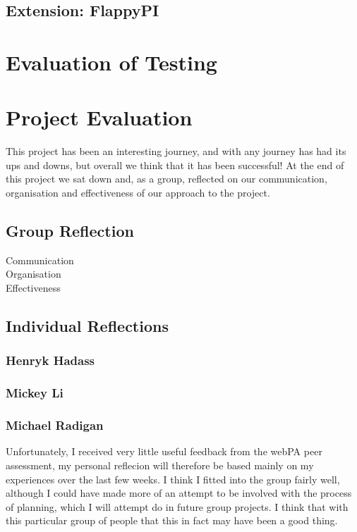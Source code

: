 \documentclass[11pt]{article}
\begin{document}
\subsection{Extension: FlappyPI}


\section{Evaluation of Testing}




\section{Project Evaluation}
This project has been an interesting journey, and with any journey has had its ups and downs, but overall we think that it has been successful! At the end of this project we sat down and, as a group, reflected on our communication, organisation and effectiveness of our approach to the project.
\subsection{Group Reflection}

\begin{description}
\item[Communication]


\item[Organisation]


\item[Effectiveness]

\end{description}

\subsection{Individual Reflections}

\subsubsection*{Henryk Hadass}

\subsubsection*{Mickey Li}

\subsubsection*{Michael Radigan}
Unfortunately, I received very little useful feedback from the webPA peer
assessment, my personal reflecion will therefore be based mainly on my
experiences over the last few weeks. I think I fitted into the group fairly 
well, although I could have made more of an attempt to be involved with
the process of planning, which I will attempt do in future group projects.
I think that with this particular group of people that this in fact may have
been a good thing.
\end{document}
